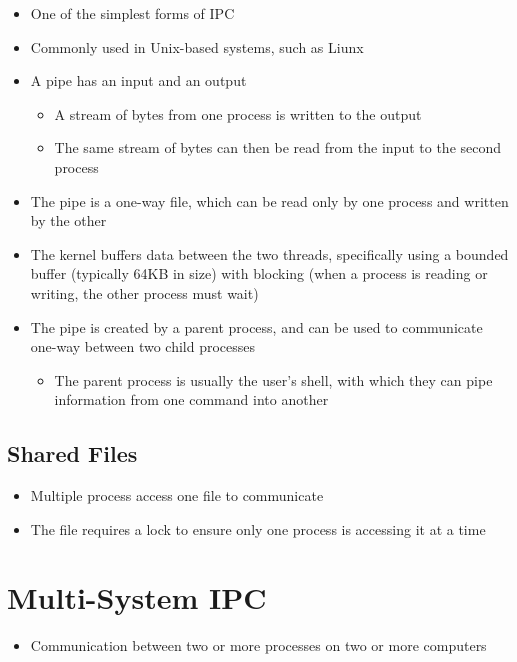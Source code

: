 \begin{itemize}
  \item One of the simplest forms of IPC
  \item Commonly used in Unix-based systems, such as Liunx
  \item A pipe has an input and an output
  \begin{itemize}
    \item A stream of bytes from one process is written to the output
    \item The same stream of bytes can then be read from the input to the second process
  \end{itemize}
  \item The pipe is a one-way file, which can be read only by one process and written by the other
  \item The kernel buffers data between the two threads, specifically using a bounded buffer (typically 64KB in size) with blocking (when a process is reading or writing, the other process must wait)
  \item The pipe is created by a parent process, and can be used to communicate one-way between two child processes
  \begin{itemize}
    \item The parent process is usually the user's shell, with which they can pipe information from one command into another
  \end{itemize}
\end{itemize}

\subsection*{Shared Files}

\begin{itemize}
  \item Multiple process access one file to communicate
  \item The file requires a lock to ensure only one process is accessing it at a time
\end{itemize}

\section*{Multi-System IPC}

\begin{itemize}
  \item Communication between two or more processes on two or more computers
\end{itemize}

